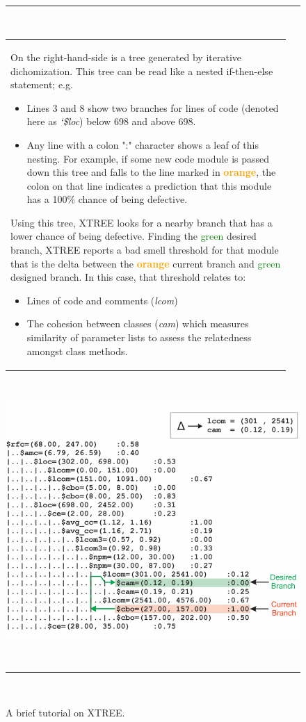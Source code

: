 \begin{figure}[t!]
~\hrule~
\begin{minipage}{.53\linewidth}
\small
 \begin{tabular}{p{0.95\linewidth}} 
 On the right-hand-side is a tree
 generated by iterative dichomization. 
 This tree can be read like a nested if-then-else statement; e.g.
 \begin{itemize}
     \item Lines 3 and 8 show two branches for lines of code (denoted here as {\em `\$loc}) below 698 and above 698.
     \item Any line with a colon ":" character shows  a  leaf  of  this  nesting.   For  example,  if  some  new  code module is passed down this tree and falls to the line marked in \textcolor{orange}{{\bf orange}},  the colon on that line indicates a prediction that this module has a 100\% chance of being defective. 
     \end{itemize}
Using this tree,
 XTREE looks for a nearby branch that has a lower chance of being defective. Finding the \textcolor{green}{{ green}} desired  branch,  XTREE reports a bad smell threshold for that module that is the delta between the \textcolor{orange}{{\bf orange}}  current branch  and   \textcolor{green}{{ green}} designed branch. 
 In this case, that threshold relates to:
 \begin{itemize}
     \item Lines of code and comments ({\em lcom}) 
     \item The cohesion between classes ({\em cam}) which measures similarity of parameter lists to assess the relatedness amongst class   methods.
     \end{itemize}\\ 
 \end{tabular}
 \end{minipage}~~~~
 \begin{minipage}{.45\linewidth}
\includegraphics[width=\linewidth]{figs/XTREE_samp.png}
\end{minipage}
~\hrule~
 \caption{A brief tutorial on XTREE.} \label{fig:xtree_samp}
\end{figure}